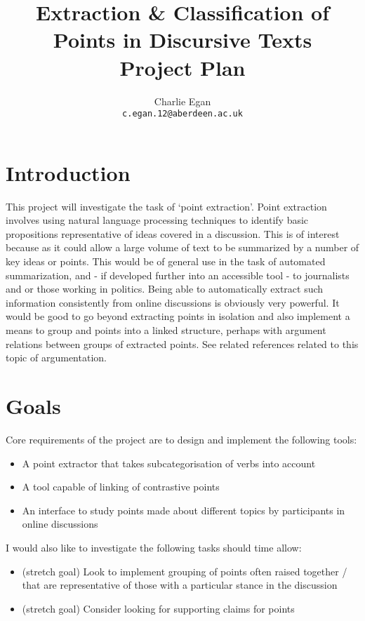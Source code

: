 \documentclass[tikz]{article}
\begin{document}
  \title{Extraction \& Classification of Points in Discursive Texts\\ Project Plan}
  \author{Charlie Egan \\ \texttt{c.egan.12@aberdeen.ac.uk}}

  \maketitle

  \section{Introduction}
  This project will investigate the task of `point extraction'. Point extraction involves using natural language processing techniques to identify basic propositions representative of ideas covered in a discussion. This is of interest because as it could allow a large volume of text to be summarized by a number of key ideas or points. This would be of general use in the task of automated summarization, and - if developed further into an accessible tool - to journalists and or those working in politics. Being able to automatically extract such information consistently from online discussions is obviously very powerful. It would be good to go beyond extracting points in isolation and also implement a means to group and points into a linked structure, perhaps with argument relations between groups of extracted points. See related references \cite{catsdogs, contradictions, opinion, wyner} related to this topic of argumentation.

  \section{Goals}
    Core requirements of the project are to design and implement the following tools:
    \begin{itemize}
      \item{A point extractor that takes subcategorisation of verbs into account}
      \item{A tool capable of linking of contrastive points}
      \item{An interface to study points made about different topics by participants in online discussions}
    \end{itemize}
    I would also like to investigate the following tasks should time allow:
    \begin{itemize}
      \item{(stretch goal) Look to implement grouping of points often raised together / that are representative of those with a particular stance in the discussion}
      \item{(stretch goal) Consider looking for supporting claims for points}
    \end{itemize}
\end{document}
